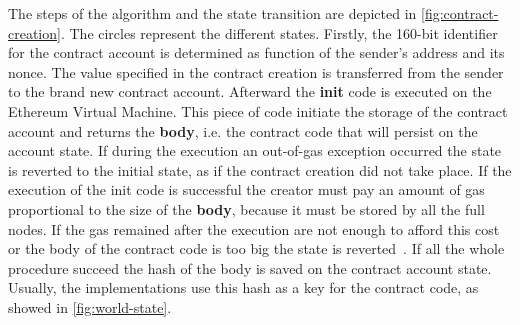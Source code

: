 The steps of the algorithm and the state transition are depicted in
\autoref{fig:contract-creation}. The circles represent the different states.
Firstly, the 160-bit identifier for the contract account is determined as
function of the sender's address and its nonce. The value specified in the
contract
creation is transferred from the sender to the brand new contract account.
Afterward the \textbf{init} code is executed on the Ethereum Virtual Machine.
This  piece of code initiate the storage of the contract account and returns the
\textbf{body}, i.e. the contract code that will persist on the account state.
If during the execution an out-of-gas exception occurred the state is reverted
to the initial state, as if the contract creation did not take place.
If the execution of the init code is successful the creator must pay an amount
of gas proportional to the size of the \textbf{body}, because it must be
stored by all the full nodes. If the gas remained after the execution are not
enough to afford this cost or the body of the contract code is too big the
state is reverted~\cite{wood2018ethereum}.
If all the whole procedure succeed the hash of the body is saved on the
contract account state. Usually, the implementations use this hash as a key for
the contract code, as showed in \autoref{fig:world-state}.
 
